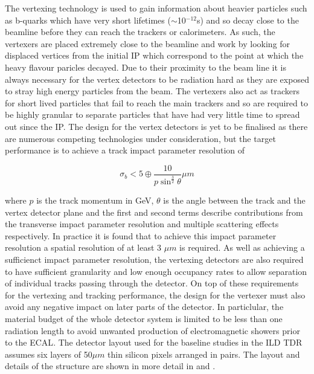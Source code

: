 The vertexing technology is used to gain information about heavier particles such as b-quarks which have very short lifetimes ($\sim$10$^{-12}$s) and so decay close to the beamline before they can reach the trackers or calorimeters. As such, the vertexers are placed extremely close to the beamline and work by looking for displaced vertices from the initial \ac{IP} which correspond to the point at which the heavy flavour paricles decayed. Due to their proximity to the beam line it is always necessary for the vertex detectors to be radiation hard as they are exposed to stray high energy particles from the beam. The vertexers also act as trackers for short lived particles that fail to reach the main trackers and so are required to be highly granular to separate particles that have had very little time to spread out since the \ac{IP}. The design for the vertex detectors is yet to be finalised as there are numerous competing technologies under consideration, but the target performance is to achieve a track impact parameter resolution of

\begin{equation}
\sigma_{b} < 5 \oplus \frac{10}{p\sin^{\frac{3}{2}}\theta}\mu m
\end{equation}

where $p$ is the track momentum in GeV, $\theta$ is the angle between the track and the vertex detector plane and the first and second terms describe contributions from the transverse impact parameter resolution and multiple scattering effects respectively.  In practice it is found that to achieve this impact parameter resolution a spatial resolution of at least 3 $\mu m$ is required. As well as achieving a sufficienct impact parameter resolution, the vertexing detectors are also required to have sufficient granularity and low enough occupancy rates to allow separation of individual tracks passing through the detector. On top of these requirements for the vertexing and tracking performance, the design for the vertexer must also avoid any negative impact on later parts of the detector. In particlular, the material budget of the whole detector system is limited to be less than one radiation length to avoid unwanted production of electromagnetic showers prior to the \ac{ECAL}. The detector layout used for the baseline studies in the \ac{ILD} \ac{TDR} assumes six layers of 50$\mu m$ thin silicon pixels arranged in pairs. The layout and details of the structure are shown in more detail in  and .

